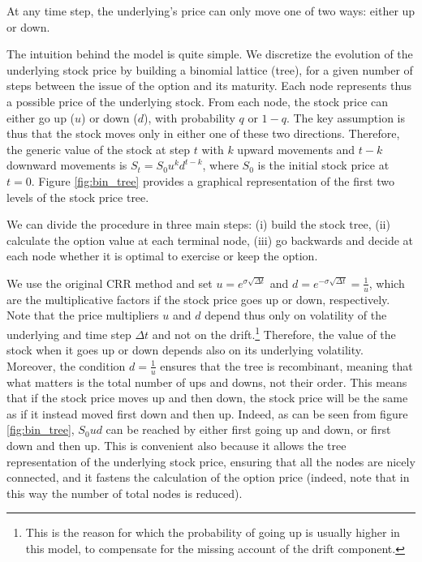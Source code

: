 \begin{assumption}
    \label{ass:bin_9}
    At any time step, the underlying's price can only move one of two ways: either up or down.
\end{assumption}

The intuition behind the model is quite simple. We discretize the evolution of the underlying stock price by building a binomial lattice (tree), for a given number of steps between the issue of the option and its maturity. Each node represents thus a possible price of the underlying stock. From each node, the stock price can either go up ($u$) or down ($d$), with probability $q$ or $1-q$. The key assumption is thus that the stock moves only in either one of these two directions. Therefore, the generic value of the stock at step $t$ with $k$ upward movements and $t-k$ downward movements is $S_t = S_0 u^k d^{t-k}$, where $S_0$ is the initial stock price at $t=0$. Figure \ref*{fig:bin_tree} provides a graphical representation of the first two levels of the stock price tree. 
  

We can divide the procedure in three main steps: (i) build the stock tree, (ii) calculate the option value at each terminal node, (iii) go backwards and decide at each node whether it is optimal to exercise or keep the option.

We use the original CRR method and set $u = e^{\sigma \sqrt{\Delta t}}$ and $d = e^{-\sigma \sqrt{\Delta t}}=\frac{1}{u}$, which are the multiplicative factors if the stock price goes up or down, respectively. Note that the price multipliers $u$ and $d$ depend thus only on volatility of the underlying and time step $\Delta t$ and not on the drift.\footnote{This is the reason for which the probability of going up is usually higher in this model, to compensate for the missing account of the drift component.} Therefore, the value of the stock when it goes up or down depends also on its underlying volatility. Moreover, the condition $d = \frac{1}{u}$ ensures that the tree is recombinant, meaning that what matters is the total number of ups and downs, not their order. This means that if the stock price moves up and then down, the stock price will be the same as if it instead moved first down and then up. Indeed, as can be seen from figure \ref*{fig:bin_tree}, $S_0ud$ can be reached by either first going up and down, or first down and then up. This is convenient also because it allows the tree representation of the underlying stock price, ensuring that all the nodes are nicely connected, and it fastens the calculation of the option price (indeed, note that in this way the number of total nodes is reduced). 

